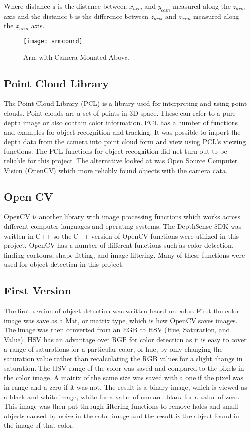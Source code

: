  Where distance a is the distance between $x_{arm}$ and $y_{cam}$ measured along the $z_{arm}$ axis and the distance b is the difference between $z_{arm}$ and $z_{cam}$ measured along the $x_{arm}$ axis. 

\begin{figure}
\centering
\texttt{[image: armcoord]}
\caption{Arm with Camera Mounted Above.}
\label{fig:mount}
\end{figure}

\subsection{Point Cloud Library}
The Point Cloud Library (PCL) is a library used for interpreting and using point clouds. Point clouds are a set of points in 3D space. These can refer to a pure depth image or also contain color information. PCL has a number of functions and examples for object recognition and tracking. It was possible to import the depth data from the camera into point cloud form and view using PCL's viewing functions. The PCL functions for object recognition did not turn out to be reliable for this project. The alternative looked at was Open Source Computer Vision (OpenCV) which more reliably found objects with the camera data. 

\subsection{Open CV}
OpenCV is another library with image processing functions which works across different computer languages and operating systems. The DepthSense SDK was written in C++ so the C++ version of OpenCV functions were utilized in this project. OpenCV has a number of different functions such as color detection, finding contours, shape fitting, and image filtering. Many of these functions were used for object detection in this project.

\subsection{First Version}
The first version of object detection was written based on color. First the color image was save as a Mat, or matrix type, which is how OpenCV saves images. The image was then converted from an RGB to HSV (Hue, Saturation, and Value). HSV has an advantage over RGB for color detection as it is easy to cover a range of saturations for a particular color, or hue, by only changing the saturation value rather than recalculating the RGB values for a slight change in saturation. The HSV range of the color was saved and compared to the pixels in the color image. A matrix of the same size was saved with a one if the pixel was in range and a zero if it was not. The result is a binary image, which is viewed as a black and white image, white for a value of one and black for a value of zero. This image was then put through filtering functions to remove holes and small objects caused by noise in the color image and the result is the object found in the image of that color.

